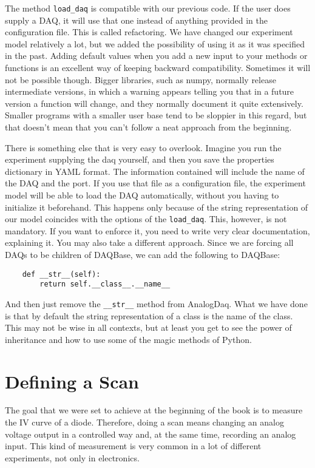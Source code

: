 The method \texttt{load_daq} is compatible with our previous code. If the user does supply a DAQ, it will use that one instead of anything provided in the configuration file. This is called refactoring. We have changed our experiment model relatively a lot, but we added the possibility of using it as it was specified in the past. Adding default values when you add a new input to your methods or functions is an excellent way of keeping backward compatibility. Sometimes it will not be possible though. Bigger libraries, such as numpy, normally release intermediate versions, in which a warning appears telling you that in a future version a function will change, and they normally document it quite extensively. Smaller programs with a smaller user base tend to be sloppier in this regard, but that doesn't mean that you can't follow a neat approach from the beginning. 


There is something else that is very easy to overlook. Imagine you run the experiment supplying the daq yourself, and then you save the properties dictionary in YAML format. The information contained will include the name of the DAQ and the port. If you use that file as a configuration file, the experiment model will be able to load the DAQ automatically, without you having to initialize it beforehand. This happens only because of the string representation of our model coincides with the options of the \texttt{load_daq}. This, however, is not mandatory. If you want to enforce it, you need to write very clear documentation, explaining it. You may also take a different approach. Since we are forcing all DAQs to be children of DAQBase, we can add the following to DAQBase:

\begin{verbatim}
    def __str__(self):
        return self.__class__.__name__
\end{verbatim}

And then just remove the \texttt{__str__} method from AnalogDaq. What we have done is that by default the string representation of a class is the name of the class. This may not be wise in all contexts, but at least you get to see the power of inheritance and how to use some of the magic methods of Python. 

\section{Defining a Scan}\label{defining-ascan}
The goal that we were set to achieve at the beginning of the book is to measure the {IV} curve of a diode. Therefore, doing a scan means changing an analog voltage output in a controlled way and, at the same time, recording an analog input. This kind of measurement is very common in a lot of different experiments, not only in electronics.

